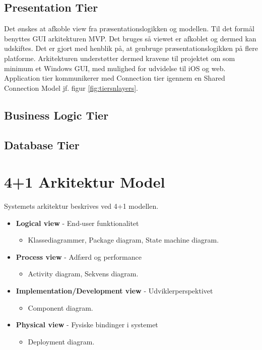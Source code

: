 \subsection{Presentation Tier}
Det ønskes at afkoble view fra præsentationslogikken og modellen. Til det formål benyttes GUI arkitekturen MVP. Det bruges så viewet er afkoblet og dermed kan udskiftes. Det er gjort med henblik på, at genbruge præsentationslogikken på flere platforme. Arkitekturen understøtter dermed kravene til projektet om som minimum et Windows GUI, med mulighed for udvidelse til iOS og web. Application tier kommunikerer med Connection tier igennem en Shared Connection Model jf. figur \ref{fig:tiersnlayers}. 

\subsection{Business Logic Tier}

\subsection{Database Tier}

\section{4+1 Arkitektur Model}
Systemets arkitektur beskrives ved 4+1 modellen. 



\begin{itemize}
	\item \textbf{Logical view} - End-user funktionalitet
	\begin{itemize}
		\item Klassediagrammer, Package diagram, State machine diagram.
	\end{itemize}
	\item \textbf{Process view} - Adfærd og performance
	\begin{itemize}
		\item Activity diagram, Sekvens diagram.
	\end{itemize}
	\item \textbf{Implementation/Development view} - Udviklerperspektivet
	\begin{itemize}
		\item Component diagram.
	\end{itemize}
	\item \textbf{Physical view} - Fysiske bindinger i systemet
	\begin{itemize}
		\item Deployment diagram.
	\end{itemize}
\end{itemize}




